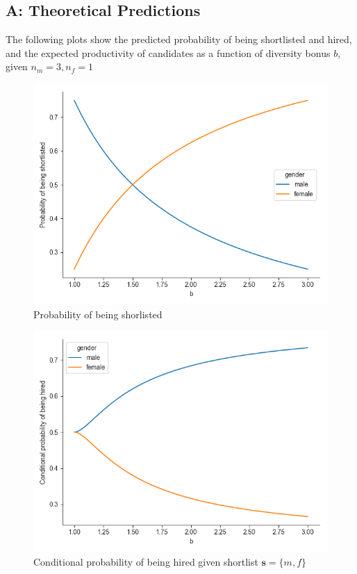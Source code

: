 \documentclass[11pt]{article}
\begin{document}
\subsection*{A: Theoretical Predictions}

The following plots show the predicted probability of being shortlisted and hired, and the expected productivity of candidates as a function of diversity bonus $b$, given $n_m=3, n_f=1$

\begin{figure}[H] %
    \centering
    \caption{Probability of being shorlisted}
    \includegraphics[width=\textwidth, keepaspectratio]{plots/prob_shortlist.png}

\end{figure}

\begin{figure}[H] %
    \centering
    \caption{Conditional probability of being hired given shortlist $\bm{s} = \{m,f\}$}
    \includegraphics[width=\textwidth, keepaspectratio]{plots/conditional_prob_hire.png}
\end{figure}
\end{document}
